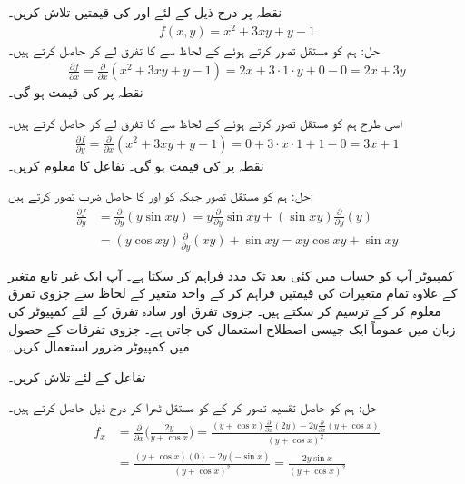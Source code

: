 نقطہ  پر درج ذیل کے لئے  اور  کی قیمتیں تلاش کریں۔
\begin{align*}
f(x,y)=x^2+3xy+y-1
\end{align*}
حل:\quad
ہم  کو مستقل تصور کرتے ہوئے  کے لحاظ سے  کا تفرق لے کر    حاصل کرتے ہیں۔
\begin{align*}
\frac{\partial f}{\partial x}=\frac{\partial}{\partial x}(x^2+3xy+y-1)=2x+3\cdot 1\cdot y+0-0=2x+3y
\end{align*}
نقطہ  پر  کی قیمت  ہو گی۔

اسی طرح ہم  کو مستقل تصور کرتے ہوئے  کے لحاظ سے  کا تفرق لے کر    حاصل کرتے ہیں۔
\begin{align*}
\frac{\partial f}{\partial y}=\frac{\partial}{\partial x}(x^2+3xy+y-1)=0+3\cdot x\cdot 1+1-0=3x+1
\end{align*}
نقطہ  پر  کی قیمت  ہو گی۔
تفاعل  کا  معلوم کریں۔

حل:\quad
ہم  کو مستقل  تصور جبکہ   کو  اور  کا حاصل ضرب تصور کرتے ہیں:
\begin{align*}
\frac{\partial f}{\partial y}&=\frac{\partial}{\partial y}(y\sin xy)=y\frac{\partial}{\partial y}\sin xy+(\sin xy)\frac{\partial}{\partial y}(y)\\
&=(y\cos xy)\frac{\partial}{\partial y}(xy) +\sin xy=xy\cos xy+\sin xy
\end{align*}

\quad کمپیوٹر آپ کو حساب میں کئی بعد  تک مدد فراہم کر سکتا ہے۔ آپ ایک غیر تابع متغیر کے علاوہ تمام متغیرات کی قیمتیں فراہم کر کے واحد  متغیر کے لحاظ سے جزوی تفرق معلوم کر  کے  ترسیم کر سکتے ہیں۔ جزوی تفرق اور سادہ تفرق کے لئے کمپیوٹر کی زبان میں عموماً  ایک جیسی اصطلاح استعمال کی جاتی ہے۔  جزوی تفرقات کے حصول میں کمپیوٹر ضرور استعمال کریں۔

تفاعل  کے لئے  تلاش کریں۔

حل:\quad
ہم  کو حاصل تقسیم تصور کر کے  کو مستقل ٹھرا  کر درج ذیل حاصل کرتے ہیں۔
\begin{align*}
f_x&=\frac{\partial}{\partial x}\big(\frac{2y}{y+\cos x}\big)=\frac{(y+\cos x)\tfrac{\partial}{\partial x}(2y)-2y\tfrac{\partial}{\partial x}(y+\cos x)}{(y+\cos x)^2}\\
&=\frac{(y+\cos x)(0)-2y(-\sin x)}{(y+\cos x)^2}=\frac{2y\sin x}{(y+\cos x)^2}
\end{align*}

